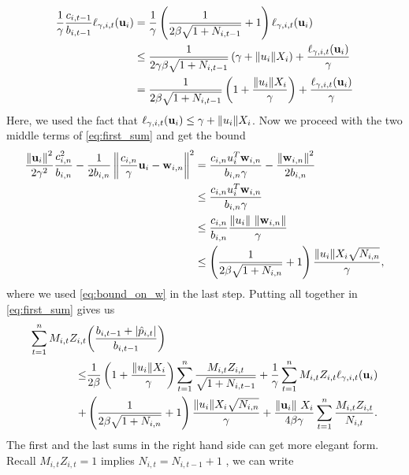 {\begin{equation*}
\begin{split}
\frac{1}{\gamma}\frac{c_{i,t-1}}{b_{i,t-1}}\ell_{\gamma,i,t}(\mathbf{u}_i)&=\frac{1}{\gamma}\left({\frac{1}{2\beta\sqrt{1+N_{i,t-1}}}+1}\right)\ell_{\gamma,i,t}(\mathbf{u}_i)\\
&\le \frac{1}{2\gamma\beta\sqrt{1+N_{i,t-1}}}\left({\gamma+\Vert u_i\Vert X_i}\right)+\frac{\ell_{\gamma,i,t}(\mathbf{u}_i)}{\gamma}\\
&=\frac{1}{2\beta\sqrt{1+N_{i,t-1}}}\left({1+\frac{\Vert u_i\Vert X_i}{\gamma}}\right)+\frac{\ell_{\gamma,i,t}(\mathbf{u}_i)}{\gamma}
\end{split}
\end{equation*}
Here, we used  the fact that $\ell_{\gamma,i,t}(\mathbf{u}_i)\le \gamma+\Vert u_i\Vert X_i$.
Now we proceed  with  the two middle terms of \eqref{eq:first_sum} and get the bound
\begin{equation*}
\begin{split}
\frac{\left\Vert {\mathbf{u}_i} \right\Vert^2}{2\gamma^2}\frac{c_{i,n}^2}{b_{i,n}}-\frac{1}{2b_{i,n}}\left\Vert {\frac{c_{i,n}}{\gamma} \mathbf{u}_i-\mathbf{w}_{i,n}} \right\Vert^2
&=\frac{c_{i,n}u_i^T\mathbf{w}_{i,n}}{b_{i,n}\gamma}-\frac{\left\Vert {\mathbf{w}_{i,n}} \right\Vert^2}{2b_{i,n}}\\
&\le \frac{c_{i,n}u_i^T\mathbf{w}_{i,n}}{b_{i,n}\gamma}\\
&\le\frac{c_{i,n}}{b_{i,n}}\frac{{\Vert u_i\Vert}~{\Vert\mathbf{w}_{i,n}\Vert}}{\gamma}\\
&\le\left({\frac{1}{2\beta\sqrt{1+N_{i,n}}}+1}\right)\frac{{\Vert u_i\Vert}X_i\sqrt{N_{i,n}}}{\gamma},
\end{split}
\end{equation*}
where we used \eqref{eq:bound_on_w} in the last step.
Putting all together in \eqref{eq:first_sum}  gives us
\begin{equation*}
\begin{split}
\sum_{t=1}^{n}M_{i,t}Z_{i,t}&{\left({\frac{b_{i,t-1} +\left\vert{\hat{p}_{i,t}}\right\vert}{b_{i,t-1}}}\right)}\\
\le &\frac{1}{2\beta}\left({1+\frac{\Vert u_i\Vert X_i}{\gamma}}\right)\sum_{t=1}^{n}{\frac{M_{i,t}Z_{i,t}}{\sqrt{1+N_{i,t-1}}}}
+\frac{1}{\gamma}\sum_{t=1}^{n}{M_{i,t}Z_{i,t}}\ell_{\gamma,i,t}(\mathbf{u}_i)\\
+&\left({\frac{1}{2\beta\sqrt{1+N_{i,n}}}+1}\right)\frac{{\Vert u_i\Vert}X_i\sqrt{N_{i,n}}}{\gamma}
+\frac{\Vert\mathbf{u}_i\Vert~ X_i}{4\beta\gamma}\sum_{t=1}^{n}{\frac{M_{i,t}Z_{i,t}}{N_{i,t}}}.
\end{split}
\end{equation*} 
The first and the last sums in the right hand side can get more elegant form. Recall $M_{i,t}Z_{i,t}=1$ implies $N_{i,t}=N_{i,t-1}+1$ , we can write  
}
